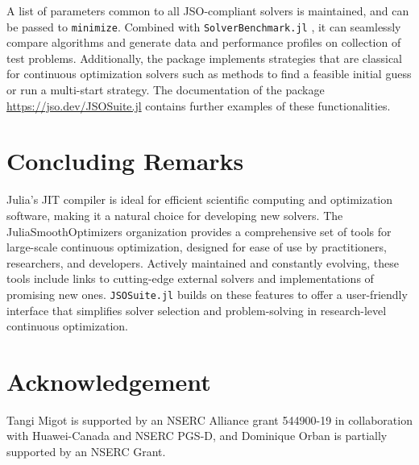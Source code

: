 \documentclass{juliacon}
\begin{document}
A list of parameters common to all JSO-compliant solvers is maintained, and can be passed to \texttt{minimize}.
%
Combined with \texttt{SolverBenchmark.jl} \cite{orban-siqueira-solverbenchmark-2020}, it can seamlessly compare algorithms and generate data and performance profiles on collection of test problems.
Additionally, the package implements strategies that are classical for continuous optimization solvers such as methods to find a feasible initial guess or run a multi-start strategy.
The documentation of the package \url{https://jso.dev/JSOSuite.jl} contains further examples of these functionalities.

\section{Concluding Remarks}

Julia’s JIT compiler is ideal for efficient scientific computing and optimization software, making it a natural choice for developing new solvers.
%
The JuliaSmoothOptimizers organization provides a comprehensive set of tools for large-scale continuous optimization, designed for ease of use by practitioners, researchers, and developers.
%
Actively maintained and constantly evolving, these tools include links to cutting-edge external solvers and implementations of promising new ones. 
%
\texttt{JSOSuite.jl} builds on these features to offer a user-friendly interface that simplifies solver selection and problem-solving in research-level continuous optimization.

\section*{Acknowledgement}

Tangi Migot is supported by an NSERC Alliance grant 544900-19 in collaboration with Huawei-Canada and NSERC PGS-D,
and Dominique Orban is partially supported by an NSERC Grant.


\end{document}
